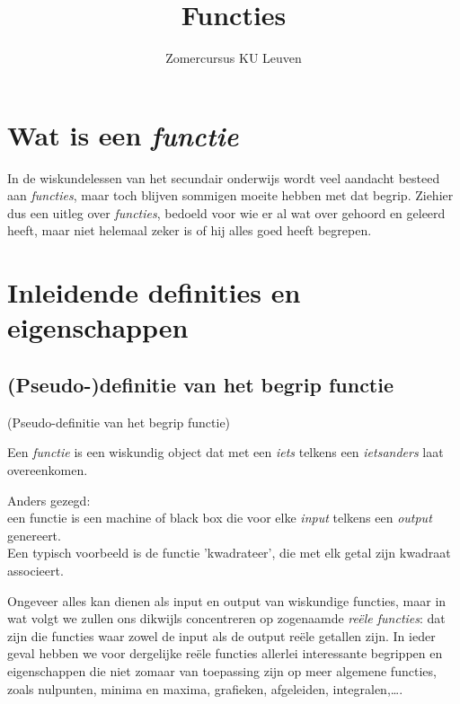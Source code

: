 \documentclass{ximera}
\author{Zomercursus KU Leuven}
\title{Functies}
\begin{document}
	
	\section*{Wat is een \textit{functie}}
\begin{footnotesize}

In de wiskundelessen van het secundair onderwijs wordt veel aandacht besteed aan \textit{functies}, maar toch blijven sommigen moeite hebben met dat begrip. Ziehier dus een uitleg over \textit{functies}, bedoeld voor wie er al wat over gehoord en geleerd heeft, maar niet helemaal zeker is of hij alles goed heeft begrepen.
\end{footnotesize}

	\tableofcontents
	\newpage

\section{Inleidende definities en eigenschappen}

\subsection{(Pseudo-)definitie van het begrip functie}

\begin{definition} (Pseudo-definitie van het begrip functie)
	
Een  \textit{functie} is een wiskundig object dat met een \textit{iets} telkens een \textit{ietsanders} laat overeenkomen. 
\end{definition}

Anders gezegd: \\
een functie is een machine of black box die voor elke \textit{input} telkens een \textit{output} genereert.
\\

Een typisch voorbeeld is de functie 'kwadrateer', die met elk getal zijn kwadraat associeert.

Ongeveer alles kan dienen als input en output van wiskundige functies, maar in wat volgt we zullen ons dikwijls concentreren op zogenaamde \textit{reële functies}: dat zijn die functies waar zowel de input als de output reële getallen zijn. In ieder geval hebben we voor dergelijke reële functies allerlei interessante begrippen en eigenschappen die niet zomaar van toepassing zijn op meer algemene functies, zoals nulpunten, minima en maxima, grafieken, afgeleiden, integralen,\ldots.
\end{document}
